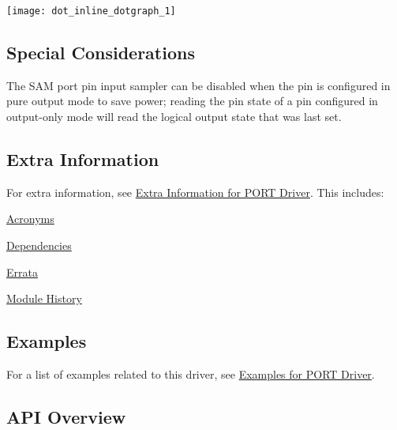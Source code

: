 \label{group__asfdoc__sam0__port__group_asfdoc_sam0_port_module_int_connections}%
\hypertarget{group__asfdoc__sam0__port__group_asfdoc_sam0_port_module_int_connections}{}%
\begin{center}

\begin{DoxyImageNoCaption}
  \mbox{\texttt{[image: dot\_inline\_dotgraph\_1]}}
\end{DoxyImageNoCaption}
\end{center}
\hypertarget{group__asfdoc__sam0__port__group_asfdoc_sam0_port_special_considerations}{}\subsection{Special Considerations}\label{group__asfdoc__sam0__port__group_asfdoc_sam0_port_special_considerations}
The S\+A\+M port pin input sampler can be disabled when the pin is configured in pure output mode to save power; reading the pin state of a pin configured in output-\/only mode will read the logical output state that was last set.\hypertarget{group__asfdoc__sam0__port__group_asfdoc_sam0_port_extra_info}{}\subsection{Extra Information}\label{group__asfdoc__sam0__port__group_asfdoc_sam0_port_extra_info}
For extra information, see \hyperlink{asfdoc_sam0_port_extra}{Extra Information for P\+O\+R\+T Driver}. This includes\+:
\begin{DoxyItemize}
\item \hyperlink{asfdoc_sam0_port_extra_asfdoc_sam0_port_extra_acronyms}{Acronyms}
\item \hyperlink{asfdoc_sam0_port_extra_asfdoc_sam0_port_extra_dependencies}{Dependencies}
\item \hyperlink{asfdoc_sam0_port_extra_asfdoc_sam0_port_extra_errata}{Errata}
\item \hyperlink{asfdoc_sam0_port_extra_asfdoc_sam0_port_extra_history}{Module History}
\end{DoxyItemize}\hypertarget{group__asfdoc__sam0__port__group_asfdoc_sam0_port_examples}{}\subsection{Examples}\label{group__asfdoc__sam0__port__group_asfdoc_sam0_port_examples}
For a list of examples related to this driver, see \hyperlink{asfdoc_sam0_port_exqsg}{Examples for P\+O\+R\+T Driver}.\hypertarget{group__asfdoc__sam0__port__group_asfdoc_sam0_port_api_overview}{}\subsection{A\+P\+I Overview}\label{group__asfdoc__sam0__port__group_asfdoc_sam0_port_api_overview}



